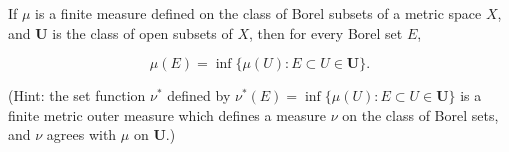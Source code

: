 If $\mu$ is a finite measure defined on the class of Borel subsets of a metric space $X$, and $\mathbf{U}$ is the class of open subsets of $X$, then for every Borel set $E$,

$$\mu(E) = \inf \{ \mu(U): E \subset U \in \mathbf{U} \}.$$

(Hint: the set function $\nu^*$ defined by $\nu^*(E) = \inf \{ \mu(U): E \subset U \in \mathbf{U} \}$ is a finite metric outer measure which defines a measure $\nu$ on the class of Borel sets, and $\nu$ agrees with $\mu$ on $\mathbf{U}$.)
